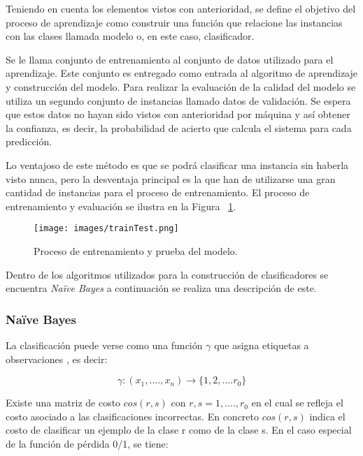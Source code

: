 Teniendo en cuenta los elementos vistos con anterioridad, se define el objetivo del proceso de aprendizaje como construir una función que relacione las instancias con las clases llamada modelo o, en este caso, clasificador.

Se le llama conjunto de entrenamiento al conjunto de datos utilizado para el aprendizaje. Este conjunto es entregado como entrada al algoritmo de aprendizaje y construcción del modelo. Para realizar la evaluación de la calidad del modelo se utiliza un segundo conjunto de instancias llamado datos de validación. Se espera que estos datos no hayan sido vistos con anterioridad por máquina y así obtener la confianza, es decir, la probabilidad de acierto que calcula el sistema para cada predicción.

Lo ventajoso de este método es que se podrá clasificar una instancia sin haberla visto nunca, pero la desventaja principal es la que han de utilizarse una gran cantidad de instancias para el proceso de entrenamiento. El proceso de entrenamiento y evaluación se ilustra en la Figura ~\ref{fig:entrenamientoEvaluacion}.

\begin{figure}[H]
	\centering
	\captionsetup{justification=centering}
	\texttt{[image: images/trainTest.png]}
	\caption[Proceso de entrenamiento y prueba del modelo.]{Proceso de entrenamiento y prueba del modelo.}
	\label{fig:entrenamientoEvaluacion}
\end{figure}

Dentro de los algoritmos utilizados para la construcción de clasificadores se encuentra \textit{Naïve Bayes} \cite{NaiveBayes2} a continuación se realiza una descripción de este. 

	\subsubsection{Naïve Bayes}
	\label{subsubsec:naiveBayes}
	
	La clasificación puede verse como una función \begin{math}\gamma\end{math} que asigna etiquetas a observaciones \cite{NaiveBayes1}, es decir:

	\[\gamma : (x_{1}, .... , x_{n}) \rightarrow \{1, 2, .... r_{0}\} \]

	Existe una matriz de costo \begin{math} cos(r, s)\end{math} con \begin{math} r, s = 1, ...., r_{0}\end{math} en el cual se refleja el costo asociado a las clasificaciones incorrectas. En concreto \begin{math} cos(r, s) \end{math} indica el costo de clasificar un ejemplo de la clase r como de la clase s. En el caso especial de la función de pérdida 0/1, se tiene:

